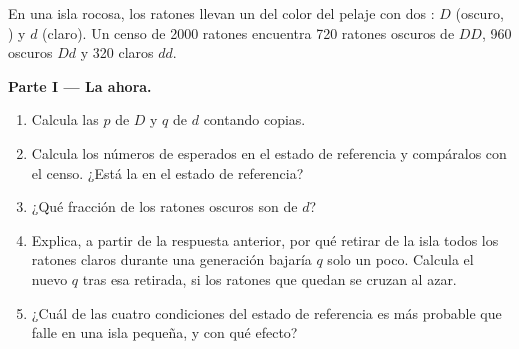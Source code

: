 \begin{problem}
\label{pb:g12:selection-drift-speciation:1}
En una isla rocosa, los ratones llevan un  del color del pelaje con
dos : $D$ (oscuro, ) y $d$ (claro). Un censo de 2000
ratones encuentra 720 ratones oscuros de  $DD$, 960 oscuros
$Dd$ y 320 claros $dd$.

\medskip
\noindent\textbf{Parte I --- La  ahora.}
\begin{enumerate}
  \item Calcula las  $p$ de $D$ y $q$ de $d$ contando
        copias.
  \item Calcula los números de  esperados en el estado de
        referencia y compáralos con el censo. ¿Está la  en el
        estado de referencia?
  \item ¿Qué fracción de los ratones oscuros son  de $d$?
  \item Explica, a partir de la respuesta anterior, por qué retirar de
        la isla todos los ratones claros durante una generación bajaría
        $q$ solo un poco. Calcula el nuevo $q$ tras esa retirada, si
        los ratones que quedan se cruzan al azar.
  \item ¿Cuál de las cuatro condiciones del estado de referencia es más
        probable que falle en una isla pequeña, y con qué efecto?
\end{enumerate}


\end{problem}
